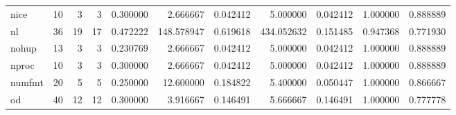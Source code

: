 \begin{longtable}{lrrrrrrrrrr}
nice      &                                      10 &                  3 &                                 3 &                                   0.300000 &                               2.666667 &                                     0.042412 &                          5.000000 &                                0.042412 &                           1.000000 &                                           0.888889 \\
nl        &                                      36 &                 19 &                                17 &                                   0.472222 &                             148.578947 &                                     0.619618 &                        434.052632 &                                0.151485 &                           0.947368 &                                           0.771930 \\
nohup     &                                      13 &                  3 &                                 3 &                                   0.230769 &                               2.666667 &                                     0.042412 &                          5.000000 &                                0.042412 &                           1.000000 &                                           0.888889 \\
nproc     &                                      10 &                  3 &                                 3 &                                   0.300000 &                               2.666667 &                                     0.042412 &                          5.000000 &                                0.042412 &                           1.000000 &                                           0.888889 \\
numfmt    &                                      20 &                  5 &                                 5 &                                   0.250000 &                              12.600000 &                                     0.184822 &                          5.400000 &                                0.050447 &                           1.000000 &                                           0.866667 \\
od        &                                      40 &                 12 &                                12 &                                   0.300000 &                               3.916667 &                                     0.146491 &                          5.666667 &                                0.146491 &                           1.000000 &                                           0.777778 \\

\end{longtable}
